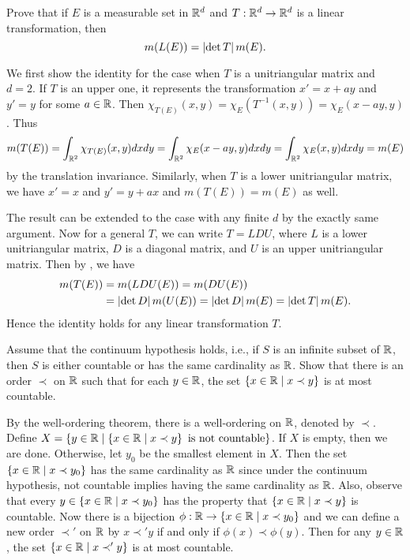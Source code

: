\begin{problem}
    Prove that if $E$ is a measurable set in $\mathbb{R}^d$ and $T:\mathbb{R}^d\to\mathbb{R}^d$ is a linear transformation, 
    then 
    \begin{equation*}
        m(L(E)) = \left\lvert {\det{T}} \right\rvert m(E).
    \end{equation*}
\end{problem}
\begin{pf}
    We first show the identity for the case when $T$ is a unitriangular matrix and $d=2$. 
    If $T$ is an upper one, it represents the transformation $x' = x + ay$ and $y' = y$ for some $a\in\mathbb{R}$. 
    Then $\chi_{T(E)}(x,y) = \chi_E(T^{-1}(x,y)) = \chi_E(x-ay,y)$. Thus
    \begin{equation*}
        m(T(E)) = \int_{\mathbb{R}^2}\chi_{T(E)}(x,y)dxdy = \int_{\mathbb{R}^2}\chi_E(x-ay,y)dxdy = \int_{\mathbb{R}^2}\chi_E(x,y)dxdy = m(E)
    \end{equation*}
    by the translation invariance. Similarly, when $T$ is a lower unitriangular matrix, we 
    have $x' = x$ and $y' = y + ax$ and $m(T(E)) = m(E)$ as well. 

    The result can be extended to the case with any finite $d$ by the exactly same 
    argument. Now for a general $T$, we can write $T = LDU$, where $L$ is a lower unitriangular 
    matrix, $D$ is a diagonal matrix, and $U$ is an upper unitriangular matrix. Then 
    by , we have 
    \begin{equation*}
        \begin{split}
            m(T(E)) &= m(LDU(E)) = m(DU(E)) \\
            &= \left\lvert {\det{D}} \right\rvert m(U(E)) = \left\lvert {\det{D}} \right\rvert m(E) = \left\lvert {\det{T}} \right\rvert m(E).
        \end{split}
    \end{equation*}
    Hence the identity holds for any linear transformation $T$.
\end{pf}

\begin{problem}
    Assume that the continuum hypothesis holds, i.e., if $S$ is an infinite subset 
    of $\mathbb{R}$, then $S$ is either countable or has the same cardinality as $\mathbb{R}$. Show 
    that there is an order $\prec$ on $\mathbb{R}$ such that for each $y\in\mathbb{R}$, the set 
    $\left\{ x\in\mathbb{R} \;\middle\vert\; x\prec y \right\}$ is at most countable.
\end{problem}
\begin{pf}
    By the well-ordering theorem, there is a well-ordering on $\mathbb{R}$, denoted by $\prec$. 
    Define $X = \left\{ y\in\mathbb{R} \;\middle\vert\; \left\{ x\in\mathbb{R} \;\middle\vert\; x\prec y \right\}\text{ is not countable} \right\}$. If $X$ is 
    empty, then we are done. Otherwise, let $y_0$ be the smallest element in $X$. 
    Then the set $\left\{ x\in\mathbb{R} \;\middle\vert\; x\prec y_0 \right\}$ has the same cardinality as $\mathbb{R}$ since under 
    the continuum hypothesis, not countable implies having the same cardinality as $\mathbb{R}$. 
    Also, observe that every $y\in\left\{ x\in\mathbb{R} \;\middle\vert\; x\prec y_0 \right\}$ has the property that 
    $\left\{ x\in\mathbb{R} \;\middle\vert\; x\prec y \right\}$ is countable. Now there is a bijection 
    $\phi:\mathbb{R}\to\left\{ x\in\mathbb{R} \;\middle\vert\; x\prec y_0 \right\}$ and we can define a new order $\prec'$ on $\mathbb{R}$ 
    by $x\prec' y$ if and only if $\phi(x)\prec\phi(y)$. Then for any $y\in\mathbb{R}$, the set 
    $\left\{ x\in\mathbb{R} \;\middle\vert\; x\prec' y \right\}$ is at most countable.
\end{pf}